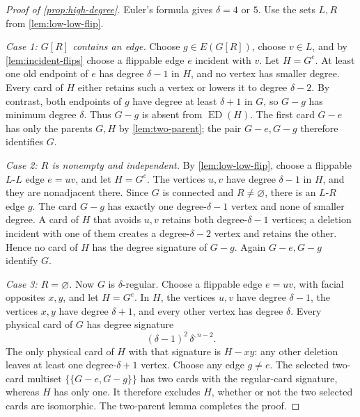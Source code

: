 \documentclass[11pt]{article}
\theoremstyle{definition}
\theoremstyle{remark}
\newcommand{\ED}{\operatorname{ED}}
\begin{document}
\begin{proof}[Proof of \cref{prop:high-degree}]
Euler's formula gives \(\delta=4\) or \(5\).  Use the sets \(L,R\) from
\cref{lem:low-low-flip}.

\smallskip
\noindent\emph{Case 1: \(G[R]\) contains an edge.}
Choose \(g\in E(G[R])\), choose \(v\in L\), and by
\cref{lem:incident-flips} choose a flippable edge \(e\) incident with
\(v\).  Let \(H=G^e\).  At least one old endpoint of \(e\) has degree
\(\delta-1\) in \(H\), and no vertex has smaller degree.  Every card of
\(H\) either retains such a vertex or lowers it to degree \(\delta-2\).
By contrast, both endpoints of \(g\) have degree at least \(\delta+1\) in
\(G\), so \(G-g\) has minimum degree \(\delta\).  Thus \(G-g\) is absent
from \(\ED(H)\).  The first card \(G-e\) has only the parents \(G,H\) by
\cref{lem:two-parent}; the pair \(G-e,G-g\) therefore identifies \(G\).

\smallskip
\noindent\emph{Case 2: \(R\) is nonempty and independent.}
By \cref{lem:low-low-flip}, choose a flippable \(L\)-\(L\) edge \(e=uv\),
and let \(H=G^e\).  The vertices \(u,v\) have degree \(\delta-1\) in
\(H\), and they are nonadjacent there.  Since \(G\) is connected and
\(R\ne\varnothing\), there is an \(L\)-\(R\) edge \(g\).  The card
\(G-g\) has exactly one degree-\(\delta-1\) vertex and none of smaller
degree.  A card of \(H\) that avoids \(u,v\) retains both
degree-\(\delta-1\) vertices; a deletion incident with one of them creates a
degree-\(\delta-2\) vertex and retains the other.  Hence no card of \(H\)
has the degree signature of \(G-g\).  Again \(G-e,G-g\) identify \(G\).

\smallskip
\noindent\emph{Case 3: \(R=\varnothing\).}
Now \(G\) is \(\delta\)-regular.  Choose a flippable edge \(e=uv\), with
facial opposites \(x,y\), and let \(H=G^e\).  In \(H\), the vertices
\(u,v\) have degree \(\delta-1\), the vertices \(x,y\) have degree
\(\delta+1\), and every other vertex has degree \(\delta\).  Every physical
card of \(G\) has degree signature
\[
               (\delta-1)^2\,\delta^{,n-2}.
\]
The only physical card of \(H\) with that signature is \(H-xy\): any other
deletion leaves at least one degree-\(\delta+1\) vertex.  Choose any edge
\(g\ne e\).  The selected two-card multiset \(\{\!\{G-e,G-g\}\!\}\) has
two cards with the regular-card signature, whereas \(H\) has only one.  It
therefore excludes \(H\), whether or not the two selected cards are
isomorphic.  The two-parent lemma completes the proof.
\end{proof}
\end{document}
